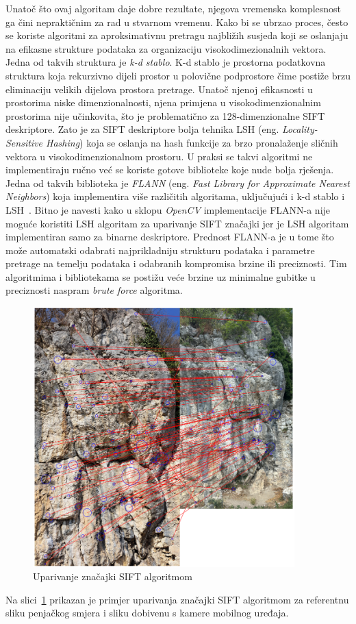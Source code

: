 Unatoč što ovaj algoritam daje dobre rezultate, njegova vremenska komplesnost ga čini nepraktičnim za rad u stvarnom vremenu. Kako bi se ubrzao proces, često se koriste algoritmi za aproksimativnu pretragu najbližih susjeda koji se oslanjaju na efikasne strukture podataka za organizaciju visokodimezionalnih vektora. 
Jedna od takvih struktura je \textit{k-d stablo}. K-d stablo je prostorna podatkovna struktura koja rekurzivno dijeli prostor u polovične podprostore čime postiže brzu eliminaciju velikih dijelova prostora pretrage. Unatoč njenoj efikasnosti u prostorima niske dimenzionalnosti, njena primjena u visokodimenzionalnim prostorima nije učinkovita, što je problematično za 128-dimenzionalne SIFT deskriptore. 
Zato je za SIFT deskriptore bolja tehnika LSH (eng. \textit{Locality-Sensitive Hashing}) koja se oslanja na hash funkcije za brzo pronalaženje sličnih vektora u visokodimenzionalnom prostoru.
U praksi se takvi algoritmi ne implementiraju ručno već se koriste gotove biblioteke koje nude bolja rješenja. Jedna od takvih biblioteka je \textit{FLANN} (eng. \textit{Fast Library for Approximate Nearest Neighbors}) koja implementira više različitih algoritama, uključujući i k-d stablo i LSH~\cite{flannmatcher}. Bitno je navesti kako u sklopu \textit{OpenCV} implementacije FLANN-a nije moguće koristiti LSH algoritam za uparivanje SIFT značajki jer je LSH algoritam implementiran samo za binarne deskriptore.
Prednost FLANN-a je u tome što može automatski odabrati najprikladniju strukturu podataka i parametre pretrage na temelju podataka i odabranih kompromisa brzine ili preciznosti. Tim algoritmima i bibliotekama se postižu veće brzine uz minimalne gubitke u preciznosti naspram \textit{brute force} algoritma.

\begin{figure}[H]
    \centering
    \includegraphics[width=0.9\textwidth]{images/racunalniVid/feature_matching.png}
    \caption{Uparivanje značajki SIFT algoritmom}
    \label{fig:uparivanje_znacajki}
\end{figure}

Na slici~\ref{fig:uparivanje_znacajki} prikazan je primjer uparivanja značajki SIFT algoritmom za referentnu sliku penjačkog smjera i sliku dobivenu s kamere mobilnog uređaja.